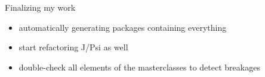 \documentclass[aspectratio=1610,14pt,dvipsnames]{beamer}
\begin{document}
\begin{frame}[noframenumbering]{}
\end{frame}

\begin{frame}[noframenumbering]{Finalizing my work}
  \begin{itemize}
    \item automatically generating packages containing everything
    \item start refactoring J/Psi as well
    \item double-check all elements of the masterclasses to detect breakages
  \end{itemize}
\end{frame}
\end{document}
